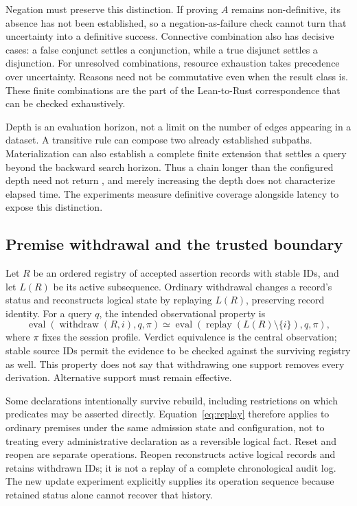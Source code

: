 Negation must preserve this distinction. If proving $A$ remains non-definitive,
its absence has not been established, so a negation-as-failure check cannot
turn that uncertainty into a definitive success. Connective combination also
has decisive cases: a false conjunct settles a conjunction, while a true
disjunct settles a disjunction. For unresolved combinations, resource exhaustion
takes precedence over uncertainty. Reasons need not be commutative even when
the result class is. These finite combinations are the part of the Lean-to-Rust
correspondence that can be checked exhaustively.

Depth is an evaluation horizon, not a limit on the number of edges appearing
in a dataset. A transitive rule can compose two already established subpaths.
Materialization can also establish a complete finite extension that settles a
query beyond the backward search horizon. Thus a chain longer than the configured
depth need not return \Resource, and merely increasing the depth does not
characterize elapsed time. The experiments measure definitive coverage alongside
latency to expose this distinction.

\subsection{Premise withdrawal and the trusted boundary}
\label{sec:withdrawal}

Let $R$ be an ordered registry of accepted assertion records with stable IDs, and
let $L(R)$ be its active subsequence. Ordinary withdrawal changes a record's
status and reconstructs logical state by replaying $L(R)$, preserving record
identity. For a query $q$, the intended observational property is
\begin{equation}
 \operatorname{eval}(\operatorname{withdraw}(R,i),q,\pi)
 \simeq
 \operatorname{eval}(\operatorname{replay}(L(R)\setminus\{i\}),q,\pi),
 \label{eq:replay}
\end{equation}
where $\pi$ fixes the session profile. Verdict equivalence is the central
observation; stable source IDs permit the evidence to be checked against the
surviving registry as well. This property does not say that withdrawing one
support removes every derivation. Alternative support must remain effective.

Some declarations intentionally survive rebuild, including restrictions on
which predicates may be asserted directly. Equation~\ref{eq:replay} therefore
applies to ordinary premises under the same admission state and configuration,
not to treating every administrative declaration as a reversible logical fact.
Reset and reopen are separate operations. Reopen reconstructs active logical
records and retains withdrawn IDs; it is not a replay of a complete chronological
audit log. The new update experiment explicitly supplies its operation sequence
because retained status alone cannot recover that history.

